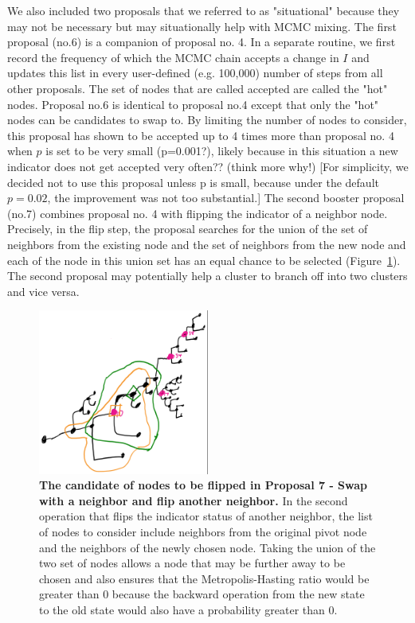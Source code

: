 \documentclass[11pt,oneside,letterpaper]{article}
\begin{document}
We also included two proposals that we referred to as "situational" because they may not be necessary but may situationally help with MCMC mixing.
The first proposal (no.6) is a companion of proposal no. 4. 
In a separate routine, we first record the frequency of which the MCMC chain accepts a change in $I$ and updates this list in every user-defined (e.g. 100,000) number of steps from all other proposals.
The set of nodes that are called accepted are called the "hot" nodes. 
Proposal no.6 is identical to proposal no.4 except that only the "hot" nodes can be candidates to swap to. 
By limiting the number of nodes to consider, this proposal has shown to be accepted up to 4 times more than proposal no. 4 when $p$ is set to be very small (p=0.001?), likely because in this situation a new indicator does not get accepted very often?? (think more why!)
[For simplicity, we decided not to use this proposal unless p is small, because under the default $p=0.02$, the improvement was not too substantial.]
The second booster proposal (no.7) combines proposal no. 4 with flipping the indicator of a neighbor node. 
Precisely, in the flip step, the proposal searches for the union of the set of neighbors from the existing node and the set of neighbors from the new node and each of the node in this union set has an equal chance to be selected (Figure~\ref{jointMultistep}).
The second proposal may potentially help a cluster to branch off into two clusters and vice versa.

\begin{figure}[h]
	\centering		
	\includegraphics[width=0.5\textwidth]{figures/jointMultistep}
	\caption{\textbf{ The candidate of nodes to be flipped in Proposal 7 - Swap with a neighbor and flip another neighbor.} 
In the second operation that flips the indicator status of another neighbor, the list of nodes to consider include neighbors from the original pivot node and the neighbors of the newly chosen node. 
Taking the union of the two set of nodes allows a node that may be further away to be chosen and also ensures that the Metropolis-Hasting ratio would be greater than 0 because the backward operation from the new state to the old state would also have a probability greater than 0.
	} 
	\label{jointMultistep} 
\end{figure}
\end{document}
